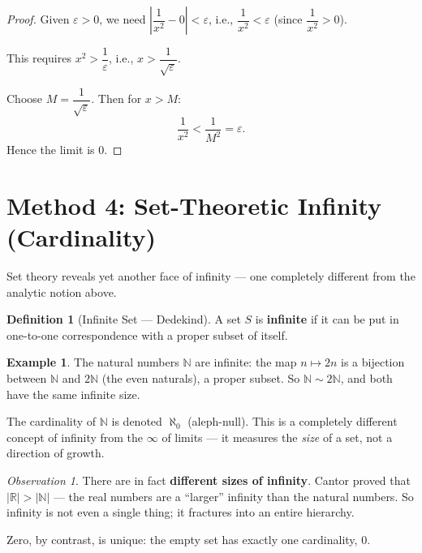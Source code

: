 \documentclass[12pt, a4paper]{article}
\theoremstyle{definition}
\newtheorem{definition}{Definition}
\newtheorem{example}{Example}
\theoremstyle{remark}
\newtheorem*{observation}{Observation}
\begin{document}
\begin{proof}
Given $\varepsilon > 0$, we need $\left|\dfrac{1}{x^2} - 0\right| < \varepsilon$, i.e., $\dfrac{1}{x^2} < \varepsilon$ (since $\dfrac{1}{x^2} > 0$).

This requires $x^2 > \dfrac{1}{\varepsilon}$, i.e., $x > \dfrac{1}{\sqrt{\varepsilon}}$.

Choose $M = \dfrac{1}{\sqrt{\varepsilon}}$. Then for $x > M$:
\[
\frac{1}{x^2} < \frac{1}{M^2} = \varepsilon.
\]
Hence the limit is $0$.
\end{proof}

\section{Method 4: Set-Theoretic Infinity (Cardinality)}

Set theory reveals yet another face of infinity — one completely different from the analytic notion above.

\begin{definition}[Infinite Set — Dedekind]
A set $S$ is \textbf{infinite} if it can be put in one-to-one correspondence with a proper subset of itself.
\end{definition}

\begin{example}
The natural numbers $\mathbb{N}$ are infinite: the map $n \mapsto 2n$ is a bijection between $\mathbb{N}$ and $2\mathbb{N}$ (the even naturals), a proper subset. So $\mathbb{N} \sim 2\mathbb{N}$, and both have the same infinite size.
\end{example}

The cardinality of $\mathbb{N}$ is denoted $\aleph_0$ (aleph-null). This is a completely different concept of infinity from the $\infty$ of limits — it measures the \emph{size} of a set, not a direction of growth.

\begin{observation}
There are in fact \textbf{different sizes of infinity}. Cantor proved that $|\mathbb{R}| > |\mathbb{N}|$ — the real numbers are a ``larger'' infinity than the natural numbers. So infinity is not even a single thing; it fractures into an entire hierarchy.

Zero, by contrast, is unique: the empty set has exactly one cardinality, $0$.
\end{observation}

\end{document}
